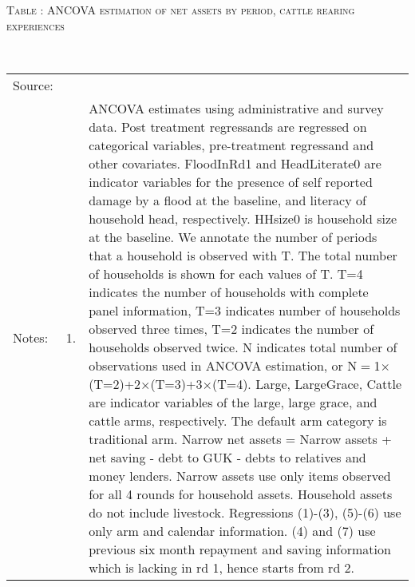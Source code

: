 \begin{minipage}[t]{14cm}
\end{minipage} \\\\\hspace{-1cm}\begin{minipage}[t]{14cm} \hfil\textsc{\normalsize Table \thetable: ANCOVA estimation of net assets by period, cattle rearing experiences\label{tab ANCOVA narrow net assets Experience timevarying 1}}\\ \setlength{\tabcolsep}{1pt}
  \setlength{\baselineskip}{8pt}
  \renewcommand{\arraystretch}{.55}
  \hfil{}\\
\renewcommand{\arraystretch}{.8}
\setlength{\tabcolsep}{1pt} \begin{tabular}{>{\hfill\scriptsize}p{1cm}<{}>{\hfill\scriptsize}p{.25cm}<{}>{\scriptsize}p{12cm}<{\hfill}} 
Source:& \multicolumn{2}{l}{\scriptsize Estimated with GUK administrative and survey data.}\\
Notes: & 1. & ANCOVA estimates using administrative and survey data. Post treatment regressands are regressed on categorical variables, pre-treatment regressand and other covariates. \textsf{FloodInRd1} and \textsf{HeadLiterate0} are indicator variables for the presence of self reported damage by a flood at the baseline, and literacy of household head, respectively. \textsf{HHsize0} is household size at the baseline. We annotate the number of periods that a household is observed with \textsf{T}. The total number of households is shown for each values of \textsf{T}. \textsf{T=4} indicates the number of households with complete panel information, \textsf{T=3} indicates number of households observed three times, \textsf{T=2} indicates the number of households observed twice. \textsf{N} indicates total number of observations used in ANCOVA estimation, or \textsf{N$=$1$\times$(T=2)+2$\times$(T=3)+3$\times$(T=4)}.  \textsf{Large}, \textsf{LargeGrace}, \textsf{Cattle} are indicator variables of the \textsf{large}, \textsf{large grace}, and \textsf{cattle} arms, respectively. The default arm category is \textsf{traditional} arm. Narrow net assets = Narrow assets + net saving - debt to GUK - debts to relatives and money lenders. Narrow assets use only items observed for all 4 rounds for household assets. Household assets do not include livestock. Regressions (1)-(3), (5)-(6) use only arm and calendar information. (4) and (7) use previous six month repayment and saving information which is lacking in rd 1, hence starts from rd 2.\\

\end{tabular}
\end{minipage}
